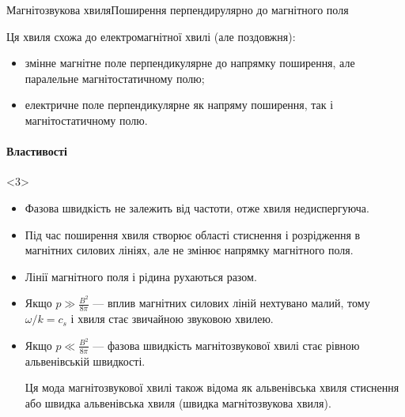 \documentclass[]{beamer}
\begin{document}
\begin{frame}{Магнітозвукова хвиля}{Поширення перпендирулярно до магнітного поля}
\begin{onlyenv}
\begin{block}{}
			Ця хвиля схожа до електромагнітної хвилі (але поздовжня):
			\begin{itemize}
				\item змінне магнітне поле перпендикулярне до напрямку поширення, але паралельне магнітостатичному полю;
				\item електричне поле перпендикулярне як напряму поширення, так і магнітостатичному полю.
			\end{itemize}
		\end{block}
	\end{onlyenv}
	\framesubtitle<3>{Властивості}
	\begin{onlyenv}
		\begin{itemize}\justifying
			\item Фазова швидкість не залежить від частоти, отже \alert{хвиля недиспергуюча}.
			\item Під час поширення хвиля створює області стиснення і розрідження в
			      магнітних силових лініях, але не \alert{змінює напрямку магнітного поля}.
			\item Лінії магнітного поля і рідина \alert{рухаються разом}.
			\item Якщо $p \gg \frac{B^2}{8\pi}$ --- вплив магнітних силових ліній нехтувано малий, тому $\omega/k = c_s$ і хвиля стає звичайною звуковою хвилею.
			\item Якщо $p \ll \frac{B^2}{8\pi}$ --- фазова швидкість магнітозвукової хвилі стає рівною альвенівській швидкості.

			      {\scriptsize  Ця мода магнітозвукової хвилі також відома як \alert{альвенівська хвиля стиснення} або \alert{швидка альвенівська хвиля} (швидка магнітозвукова хвиля). }
		\end{itemize}
	\end{onlyenv}
\end{frame}
\end{document}
